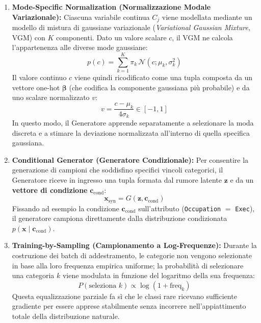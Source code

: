 \begin{enumerate}
    \item \textbf{Mode-Specific Normalization (Normalizzazione Modale Variazionale):}
    Ciascuna variabile continua $C_j$ viene modellata mediante un modello di mistura di gaussiane variazionale (\textit{Variational Gaussian Mixture}, VGM) con $K$ componenti. Dato un valore scalare $c$, il VGM ne calcola l'appartenenza alle diverse mode gaussiane:
    \begin{equation}
        p(c) = \sum_{k=1}^K \pi_k \, \mathcal{N}(c; \mu_k, \sigma_k^2)
    \end{equation}
    Il valore continuo $c$ viene quindi ricodificato come una tupla composta da un vettore one-hot $\boldsymbol{\beta}$ (che codifica la componente gaussiana più probabile) e da uno scalare normalizzato $v$:
    \begin{equation}
        v = \frac{c - \mu_k}{4 \sigma_k} \in [-1, 1]
    \end{equation}
    In questo modo, il Generatore apprende separatamente a selezionare la moda discreta e a stimare la deviazione normalizzata all'interno di quella specifica gaussiana.

    \item \textbf{Conditional Generator (Generatore Condizionale):}
    Per consentire la generazione di campioni che soddisfino specifici vincoli categorici, il Generatore riceve in ingresso una tupla formata dal rumore latente $\mathbf{z}$ e da un \textbf{vettore di condizione} $\mathbf{c}_{\text{cond}}$:
    \begin{equation}
        \mathbf{x}_{\text{syn}} = G(\mathbf{z}, \mathbf{c}_{\text{cond}})
    \end{equation}
    Fissando ad esempio la condizione $\mathbf{c}_{\text{cond}}$ sull'attributo (\texttt{Occupation} $=$ \texttt{Exec}), il generatore campiona direttamente dalla distribuzione condizionata $p(\mathbf{x} \mid \mathbf{c}_{\text{cond}})$.

    \item \textbf{Training-by-Sampling (Campionamento a Log-Frequenze):}
    Durante la costruzione dei batch di addestramento, le categorie non vengono selezionate in base alla loro frequenza empirica uniforme; la probabilità di selezionare una categoria $k$ viene modulata in funzione del logaritmo della sua frequenza:
    \begin{equation}
        P(\text{seleziona } k) \propto \log(1 + \text{freq}_k)
    \end{equation}
    Questa equalizzazione parziale fa sì che le classi rare ricevano sufficiente gradiente per essere apprese stabilmente senza incorrere nell'appiattimento totale della distribuzione naturale.
\end{enumerate}

